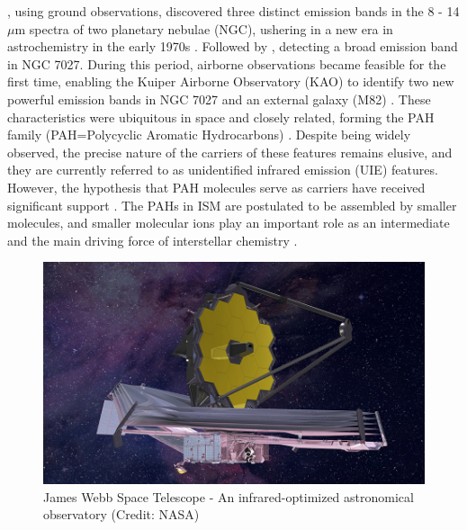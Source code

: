 \citet{gillett_8_1973}, using ground observations, discovered three distinct emission bands in the 8 - 14 $\mu$m spectra of two planetary nebulae (NGC), ushering in a new era in astrochemistry in the early 1970s \cite{li_spitzers_2020}. 
Followed by \citet{merrill_2_1975}, detecting a broad emission band in NGC 7027.
During this period, airborne observations became feasible for the first time, enabling the Kuiper Airborne Observatory (KAO) to identify two new powerful emission bands in NGC 7027 and an external galaxy (M82) \cite{russell_4_1977, willner_2_1977}.
These characteristics were ubiquitous in space and closely related, forming the PAH family (PAH=Polycyclic Aromatic Hydrocarbons) \cite{li_spitzers_2020}.
Despite being widely observed, the precise nature of the carriers of these features remains elusive, and they are currently referred to as unidentified infrared emission (UIE) features.
However, the hypothesis that PAH molecules serve as carriers have received significant support \cite{leger_identification_1984, allamandola_polycyclic_1985}. The PAHs in ISM are postulated to be 
assembled by smaller molecules, and smaller molecular ions play an important role as an intermediate 
and the main driving force of interstellar chemistry \cite{smith_ion_1992,herbst_dense_1988,CGP2015}.

\begin{figure}[!htb]
    \centering
    \includegraphics[scale=0.3]{figures/intro/JWST.jpg}
    \caption{James Webb Space Telescope - An infrared-optimized astronomical observatory (Credit: NASA)}
    \label{fig:JWST}
\end{figure}

